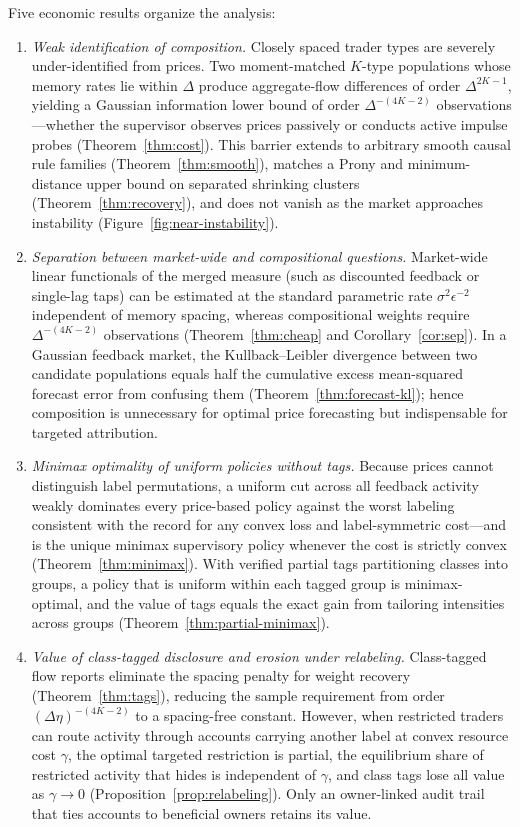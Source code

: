 \documentclass[11pt,letterpaper]{article}
\theoremstyle{definition}
\begin{document}
Five economic results organize the analysis:
\begin{enumerate}
  \item \emph{Weak identification of composition.} Closely spaced trader types are severely under-identified from prices. Two moment-matched $K$-type populations whose memory rates lie within $\Delta$ produce aggregate-flow differences of order $\Delta^{2K-1}$, yielding a Gaussian information lower bound of order $\Delta^{-(4K-2)}$ observations—whether the supervisor observes prices passively or conducts active impulse probes (Theorem~\ref{thm:cost}). This barrier extends to arbitrary smooth causal rule families (Theorem~\ref{thm:smooth}), matches a Prony and minimum-distance upper bound on separated shrinking clusters (Theorem~\ref{thm:recovery}), and does not vanish as the market approaches instability (Figure~\ref{fig:near-instability}).
  \item \emph{Separation between market-wide and compositional questions.} Market-wide linear functionals of the merged measure (such as discounted feedback or single-lag taps) can be estimated at the standard parametric rate $\sigma^2 \epsilon^{-2}$ independent of memory spacing, whereas compositional weights require $\Delta^{-(4K-2)}$ observations (Theorem~\ref{thm:cheap} and Corollary~\ref{cor:sep}). In a Gaussian feedback market, the Kullback--Leibler divergence between two candidate populations equals half the cumulative excess mean-squared forecast error from confusing them (Theorem~\ref{thm:forecast-kl}); hence composition is unnecessary for optimal price forecasting but indispensable for targeted attribution.
  \item \emph{Minimax optimality of uniform policies without tags.} Because prices cannot distinguish label permutations, a uniform cut across all feedback activity weakly dominates every price-based policy against the worst labeling consistent with the record for any convex loss and label-symmetric cost—and is the unique minimax supervisory policy whenever the cost is strictly convex (Theorem~\ref{thm:minimax}). With verified partial tags partitioning classes into groups, a policy that is uniform within each tagged group is minimax-optimal, and the value of tags equals the exact gain from tailoring intensities across groups (Theorem~\ref{thm:partial-minimax}).
  \item \emph{Value of class-tagged disclosure and erosion under relabeling.} Class-tagged flow reports eliminate the spacing penalty for weight recovery (Theorem~\ref{thm:tags}), reducing the sample requirement from order $(\Delta\eta)^{-(4K-2)}$ to a spacing-free constant. However, when restricted traders can route activity through accounts carrying another label at convex resource cost $\gamma$, the optimal targeted restriction is partial, the equilibrium share of restricted activity that hides is independent of $\gamma$, and class tags lose all value as $\gamma \to 0$ (Proposition~\ref{prop:relabeling}). Only an owner-linked audit trail that ties accounts to beneficial owners retains its value.

\end{enumerate}
\end{document}
